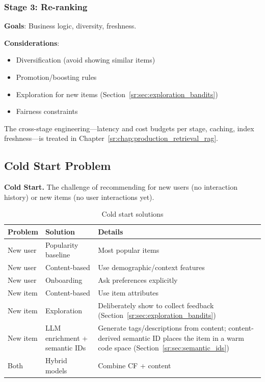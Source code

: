 \subsubsection{Stage 3: Re-ranking}

\textbf{Goals}: Business logic, diversity, freshness.

\textbf{Considerations}:
\begin{itemize}
    \item Diversification (avoid showing similar items)
    \item Promotion/boosting rules
    \item Exploration for new items (Section~\ref{sr:sec:exploration_bandits})
    \item Fairness constraints
\end{itemize}

The cross-stage engineering---latency and cost budgets per stage, caching, index freshness---is treated in Chapter~\ref{sr:chap:production_retrieval_rag}.

\subsection{Cold Start Problem}

\textbf{Cold Start.} The challenge of recommending for new users (no interaction history) or new items (no user interactions yet).

\begin{table}[H]
\centering
\caption{Cold start solutions}
\begin{tabularx}{\textwidth}{lXX}
\toprule
\textbf{Problem} & \textbf{Solution} & \textbf{Details} \\
\midrule
New user & Popularity baseline & Most popular items \\
New user & Content-based & Use demographic/context features \\
New user & Onboarding & Ask preferences explicitly \\
New item & Content-based & Use item attributes \\
New item & Exploration & Deliberately show to collect feedback (Section~\ref{sr:sec:exploration_bandits}) \\
New item & LLM enrichment + semantic IDs & Generate tags/descriptions from content; content-derived semantic ID places the item in a warm code space (Section~\ref{sr:sec:semantic_ids}) \\
Both & Hybrid models & Combine CF + content \\
\bottomrule
\end{tabularx}
\end{table}


